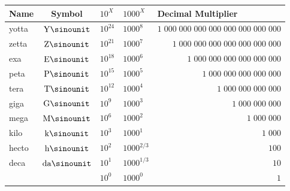 \begin{tabular}{|l|c|l|l|l|}
    \hline
    Name & Symbol & ${10}^X$ & ${1000}^X$ & Decimal Multiplier \\
    \hline
    \hline
    yotta & $\si{\yotta\sinounit} $ & ${10}^{ 24}$ & ${1000}^{ 8  }$
          & $1\;000\;000\;000\;000\;000\;000\;000\;000$ \\ \cline{5-5}
    zetta & $\si{\zetta\sinounit} $ & ${10}^{ 21}$ & ${1000}^{ 7  }$
          & $\phantom{0\;00}1\;000\;000\;000\;000\;000\;000\;000$ \\ \cline{5-5}
    exa   & $\si{\exa\sinounit  } $ & ${10}^{ 18}$ & ${1000}^{ 6  }$
          & $\phantom{0\;000\;00}1\;000\;000\;000\;000\;000\;000$ \\ \cline{5-5}
    peta  & $\si{\peta\sinounit } $ & ${10}^{ 15}$ & ${1000}^{ 5  }$
          & $\phantom{0\;000\;000\;00}1\;000\;000\;000\;000\;000$ \\ \cline{5-5}
    tera  & $\si{\tera\sinounit } $ & ${10}^{ 12}$ & ${1000}^{ 4  }$
          & $\phantom{0\;000\;000\;000\;00}1\;000\;000\;000\;000$ \\ \cline{5-5}
    giga  & $\si{\giga\sinounit } $ & ${10}^{  9}$ & ${1000}^{ 3  }$
          & $\phantom{0\;000\;000\;000\;000\;00}1\;000\;000\;000$ \\ \cline{5-5}
    mega  & $\si{\mega\sinounit } $ & ${10}^{  6}$ & ${1000}^{ 2  }$
          & $\phantom{0\;000\;000\;000\;000\;000\;00}1\;000\;000$ \\ \cline{5-5}
    kilo  & $\si{\kilo\sinounit } $ & ${10}^{  3}$ & ${1000}^{ 1  }$
          & $\phantom{0\;000\;000\;000\;000\;000\;000\;00}1\;000$ \\ \hline
    hecto & $\si{\hecto\sinounit} $ & ${10}^{  2}$ & ${1000}^{ 2/3}$
          & $\phantom{0\;000\;000\;000\;000\;000\;000\;000}\;100$ \\ \cline{5-5}
    deca  & $\si{\deca\sinounit } $ & ${10}^{  1}$ & ${1000}^{ 1/3}$
          & $\phantom{0\;000\;000\;000\;000\;000\;000\;000\;0}10$ \\ \hline

          &                & ${10}^{  0}$ & ${1000}^{ 0  }$
          & $\phantom{0\;000\;000\;000\;000\;000\;000\;000\;00}1$ \\ \hline


\end{tabular}
